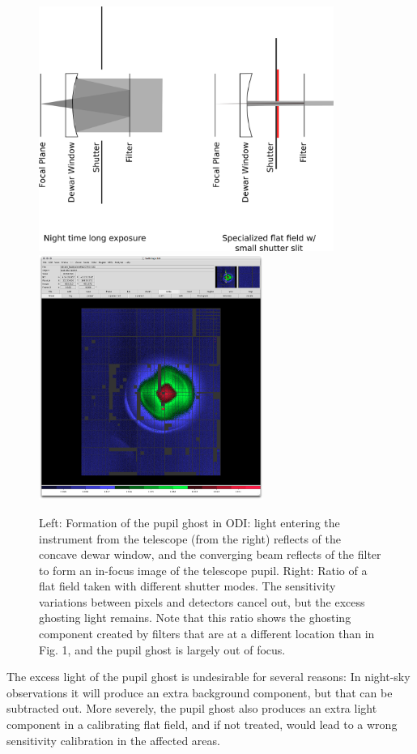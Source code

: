 \documentclass[]{spieman}
\begin{document}
\begin{figure}
	\includegraphics[height=8cm]{images/odishutterpupilghostsupression.png}
	\hspace{0.5cm} \includegraphics[height=8cm]{images/odi_layeronepg.png}
	
	\caption{ \label{fig_pupilghost}Left: Formation of the pupil ghost in ODI:  light 
		entering the instrument from the telescope (from the right) reflects of the
		concave dewar window, and the converging beam reflects of the filter to
		form an in-focus image of the telescope pupil. Right: Ratio of a flat
		field taken with different shutter modes. The sensitivity variations between
		pixels and detectors cancel out, but the excess ghosting light remains. Note
		that this ratio shows the ghosting component created by filters that are at
		a different location than in Fig. 1, and the pupil ghost is largely out of
		focus.}
\end{figure}

The excess light of the pupil ghost is undesirable for several reasons: In
night-sky observations it will produce an extra background component, but that
can be subtracted out. More severely, the pupil ghost also produces an extra
light component in a calibrating flat field, and if not treated, would lead to a
wrong sensitivity calibration in the affected areas.
\end{document}
